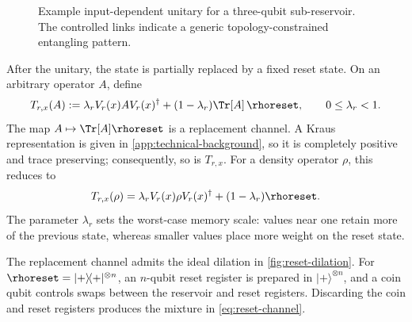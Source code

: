 \begin{figure}[t]
\centering
{}
\caption{Example input-dependent unitary for a three-qubit sub-reservoir. The
controlled links indicate a generic topology-constrained entangling pattern.}
\label{fig:unitary}
\end{figure}

After the unitary, the state is partially replaced by a fixed reset state. On
an arbitrary operator \(A\), define
\begin{equation}
    T_{r,x}(A)
    :=
    \lambda_r V_r(x) A V_r(x)^\dagger
    +(1-\lambda_r)\Tr[A] \,\rhoreset,
    \qquad 0\leq\lambda_r<1.
    \label{eq:reset-channel}
\end{equation}
The map \(A\mapsto\Tr[A]\rhoreset\) is a replacement channel. A Kraus
representation is given in \cref{app:technical-background}, so it is completely
positive and trace preserving; consequently, so is \(T_{r,x}\). For a density
operator \(\rho\), this reduces to
\[
    T_{r,x}(\rho)
    =
    \lambda_r V_r(x)\rho V_r(x)^\dagger
    +(1-\lambda_r)\rhoreset.
\]
The parameter \(\lambda_r\) sets the worst-case memory scale: values near one
retain more of the previous state, whereas smaller values place more weight on
the reset state.

The replacement channel admits the ideal dilation in
\cref{fig:reset-dilation}. For
\(\rhoreset=\lvert+\rangle\!\langle+\rvert^{\otimes n}\), an \(n\)-qubit reset
register is prepared in \(\lvert+\rangle^{\otimes n}\), and a coin qubit
controls swaps between the reservoir and reset registers. Discarding the coin
and reset registers produces the mixture in \cref{eq:reset-channel}.

